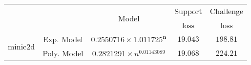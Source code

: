 \begin{tabular}{ccccc} 
\hline 
 &  & \multirow{2}{*}{Model} & Support & Challenge\tabularnewline 
 &  &  & loss  & loss\tabularnewline 
\hline 
\hline 
\multirow{2}{*}{minic2d} & Exp. Model & $\mathbf{0.2550716\times 1.011725^{n}}$ & $\mathbf{19.043}$ & $\mathbf{198.81}$ \tabularnewline 
 & Poly. Model & $0.2821291\times n^{0.01143089}$ & $19.068$ & $224.21$ \tabularnewline 
\hline 
\end{tabular} 

